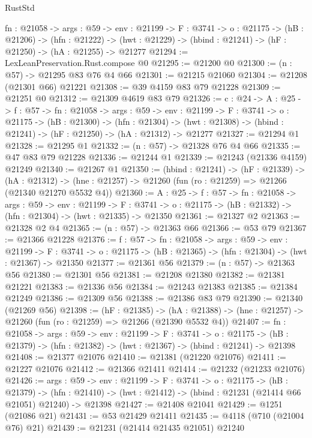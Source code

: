\begin{lexlean}{RustStd}
\begin{coremodule}
  {fn : @21058} ->
  {args : @59} ->
  {env : @21199} ->
  {F : @3741} ->
  {o : @21175} ->
  (hB : @21206) ->
  (hfn : @21222) -> (hwt : @21229) -> (hbind : @21241) -> (hF : @21250) -> (hA : @21255) -> @21277
@21294 := LexLeanPreservation.Rust.compose @0
@21295 := @21200 @0
@21300 := (n : @57) -> @21295 @83 @76 @4 @66
@21301 := @21215 @21060
@21304 := @21208 (@21301 @66) @21221
@21308 := @39 @4159 @83 @79 @21228
@21309 := @21251 @0
@21312 := @21309 @4619 @83 @79
@21326 := {c : @24} ->
  {A : @25} ->
  {f : @57} ->
  {fn : @21058} ->
  {args : @59} ->
  {env : @21199} ->
  {F : @3741} ->
  {o : @21175} ->
  (hB : @21300) ->
  (hfn : @21304) -> (hwt : @21308) -> (hbind : @21241) -> (hF : @21250) -> (hA : @21312) -> @21277
@21327 := @21294 @1
@21328 := @21295 @1
@21332 := (n : @57) -> @21328 @76 @4 @66
@21335 := @47 @83 @79 @21228
@21336 := @21244 @1
@21339 := @21243 (@21336 @4159) @21249
@21340 := @21267 @1
@21350 := (hbind : @21241) ->
  (hF : @21339) ->
  (hA : @21312) -> (hne : @21257) -> @21260 (fun (ro : @21259) => @21266 (@21340 @21270 @5532 @4))
@21360 := {A : @25} ->
  {f : @57} ->
  {fn : @21058} ->
  {args : @59} ->
  {env : @21199} ->
  {F : @3741} -> {o : @21175} -> (hB : @21332) -> (hfn : @21304) -> (hwt : @21335) -> @21350
@21361 := @21327 @2
@21363 := @21328 @2 @4
@21365 := (n : @57) -> @21363 @66
@21366 := @53 @79
@21367 := @21366 @21228
@21376 := {f : @57} ->
  {fn : @21058} ->
  {args : @59} ->
  {env : @21199} ->
  {F : @3741} -> {o : @21175} -> (hB : @21365) -> (hfn : @21304) -> (hwt : @21367) -> @21350
@21377 := @21361 @56
@21379 := (n : @57) -> @21363 @56
@21380 := @21301 @56
@21381 := @21208 @21380
@21382 := @21381 @21221
@21383 := @21336 @56
@21384 := @21243 @21383
@21385 := @21384 @21249
@21386 := @21309 @56
@21388 := @21386 @83 @79
@21390 := @21340 (@21269 @56)
@21398 := (hF : @21385) ->
  (hA : @21388) -> (hne : @21257) -> @21260 (fun (ro : @21259) => @21266 (@21390 @5532 @4))
@21407 := {fn : @21058} ->
  {args : @59} ->
  {env : @21199} ->
  {F : @3741} ->
  {o : @21175} -> (hB : @21379) -> (hfn : @21382) -> (hwt : @21367) -> (hbind : @21241) -> @21398
@21408 := @21377 @21076
@21410 := @21381 (@21220 @21076)
@21411 := @21227 @21076
@21412 := @21366 @21411
@21414 := @21232 (@21233 @21076)
@21426 := {args : @59} ->
  {env : @21199} ->
  {F : @3741} ->
  {o : @21175} ->
  (hB : @21379) ->
  (hfn : @21410) -> (hwt : @21412) -> (hbind : @21231 (@21414 @66 @21051) @21240) -> @21398
@21427 := @21408 @21041
@21429 := @1251 (@21086 @21)
@21431 := @53 @21429 @21411
@21435 := @4118 (@710 (@21004 @76) @21)
@21439 := @21231 (@21414 @21435 @21051) @21240

\end{coremodule}
\end{lexlean}
